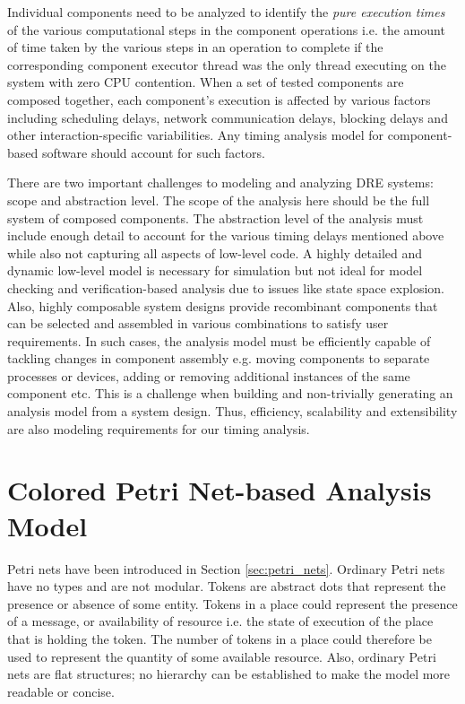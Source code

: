 Individual components need to be analyzed to identify the \emph{pure execution times} of the various computational steps in the component operations i.e. the amount of time taken by the various steps in an operation to complete if the corresponding component executor thread was the only thread executing on the system with zero CPU contention. When a set of tested components are composed together, each component's execution is affected by various factors including scheduling delays, network communication delays, blocking delays and other interaction-specific variabilities. Any timing analysis model for component-based software should account for such factors. 

There are two important challenges to modeling and analyzing DRE systems: scope and abstraction level. The scope of the analysis here should be the full system of composed components. The abstraction level of the analysis must include enough detail to account for the various timing delays mentioned above while also not capturing all aspects of low-level code. A highly detailed and dynamic low-level model is necessary for simulation but not ideal for model checking and verification-based analysis due to issues like state space explosion. Also, highly composable system designs provide recombinant components that can be selected and assembled in various combinations to satisfy user requirements. In such cases, the analysis model must be efficiently capable of tackling changes in component assembly e.g. moving components to separate processes or devices, adding or removing additional instances of the same component etc. This is a challenge when building and non-trivially generating an analysis model from a system design. Thus, efficiency, scalability and extensibility are also modeling requirements for our timing analysis.

\section{Colored Petri Net-based Analysis Model}

Petri nets have been introduced in Section \ref{sec:petri_nets}. Ordinary Petri nets have no types and are not modular. Tokens are abstract dots that represent the presence or absence of some entity. Tokens in a place could represent the presence of a message, or availability of resource i.e. the state of execution of the place that is holding the token. The number of tokens in a place could therefore be used to represent the quantity of some available resource. Also, ordinary Petri nets are flat structures; no hierarchy can be established to make the model more readable or concise. 

